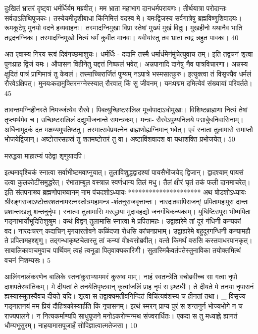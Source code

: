   दुःखितं भ्रातरं दृष्ट्वा धर्मर्धिर्यम मब्रवीत्।
 मम भ्राता महाभाग दानधर्मपरायणः।
 तीर्थयात्रा परोदान्तः सर्वदाऽतिथिपूजकः।
 तस्येयमीदृशीबाधा किंनिमित्तं वदस्व मे।
 यमःद्विजस्य सर्वगात्रेषु ब्रह्मविष्णुशिवादयः।
 रूमकूटेषु मुनयो वदने हव्यवाहनः।
 तस्मादग्निमुखा विप्रा स्तेषां मुख्यं मुखं विदुः।
 मुखहीनो यथानैव भाति तद्वदनग्निकः।
 तस्मादग्निमुखो नित्यं धर्मं कुर्वीत मानवः।
 यवीयांस्तु तव भ्राता त्वद्व न्नहुत पावकः।
 40

  अत एवास्य निरय स्त्वं दिवंगच्छमाशुचः।
 धर्मर्धिः -
ददामि तस्मै धर्मार्धमेनंमुंचेत्युवाच तम्।
 इति तद्वचनं शृत्वा पुनःप्राह द्विजं यमः।
 औपासन विहीनेतु यद्दत्तं निष्फलं भवेत्।
 अन्नपानादि दानेषु नैव पात्रविचारणा।
 अन्नस्य क्षुदितं पात्रं प्राणिमात्रं तु केवलं।
 तस्माच्चिरार्जितं पुण्यम् नऽपात्रे भस्मसात्कुरु।
 इत्युक्त्वा तं विसृज्यैव धर्मलं रौरवेऽक्षिपत्।
 मुनयःकदामुक्तिरनग्नेस्स्यात् रौरवात् किं सु जीवनम्।
 यमःपद्मम दमित्येवं संख्यायां परिवर्तते।
 45

  तावन्तमग्निहीनस्ते निमज्जंत्येव रौरवे।
 पिबत्युच्छिष्टसलिल मूर्ध्वपादाऽधोमुखाः।
 विशिष्टब्राह्मणा नित्यं तेषां तृप्त्यर्थमेव च।
 उच्छिष्टसलिलं दद्युभॊजनान्ते समन्त्रकम्।
 मन्त्रः- रौरवेऽपुण्यनिलये पद्मार्बुधनिवासिनाम्।
 अर्धिनामुदकं दत मक्षय्यमुपतिष्ठतु।
 तस्मात्सर्वप्रयत्नेन ब्राह्मणोह्यग्निमान् भवेत्।
 एवं स्नाता तुलामासे समाप्तौ भोजयेद्विजान्।
 अष्टोत्तरसहस्रं तु शतमष्टोत्तरं तु वा।
 अष्टाविंशवादश वा यथाशक्ति प्रभोजयेत्।
 50

  मरुद्धया माहात्म्यं पठेद्वा शृणुयादपि।
 
इत्थमावृश्चिकं स्नात्वा सर्वाभीष्टमवाप्नुयात्।
 तुलाविशुद्धद्वादश्यां पायसैभॊजयेद् द्विजान्।
 द्वादश्याम् पायसं दत्वा कुलकोटींसमुद्धरेत्।
 रंभाताम्बूल वस्त्रान्न स्वर्णधान्य तिलं मधु।
 तैलं क्षीरं घृतं तकं फली दानमाचरेत्।
 इति संतपनाख्य ब्रह्मणोपाख्यानम् नाम
पंचदशोऽध्यायः
*********************
अथ षोडशोऽध्यायः श्रीरङ्गराजाऽष्टोत्तरशतनामरत्नस्तोत्रमहामन्त्र
-शंतनुराजवृत्तान्तः।
 नारदःतवापिराजन्! प्रपितामहःपुरा दान्तः
प्रशान्तःखलु शन्तनुर्नृपः।
 स्नात्वा तुलामासि मरुद्धाया
मुदावहद्यो जनगंधिकन्यकाम्।
 युधिष्टिरःपुरा भीष्मपिता गङ्गाभार्योभूदितिशुश्रुम।
 कथं विद्वन् तुलामासि स्नात्वा मे प्रपितामहः।
 उद्वाह्यरेमे तां दूरं गंधिनी कन्यकां वद।
 नारदःचरन् कदाचिन् मृगयारतोवने
कळिंदजा रोधसि कांचनप्रभाम्।
 उद्वाह्यरेमे बहुदूरगन्धिनी
कन्यामहौ ते प्रपितामहश्शृणु।
 तद्गन्धाकृष्टचेतास्तु तां कन्यां वीक्ष्यसोब्रवीत्।
 वत्से किमर्थं वससि कस्तवाधरपानकृत्।
 साबालिकावाचमुवाच पार्थिवम्
त्वहं त्वनूडा पितृवाक्यकारिणी।
 सुतास्मिकैवर्तपतेस्तुनाविका
तयोक्तमित्थं वचनं निशम्यसः।
5

 आलिंगनालंकरणेन बालिके
स्तनांकुराभ्याममरं कुरुष्व माम्।
 नाहं स्वतन्त्रेति वचोब्रवीच्च सा
गत्वा नृपो दाशपतेरथांतिकम्।
 मे दीयतां ते तनयेतिपृष्टवान्
कृत्वांजलिं प्राह नृपं स हृष्टधीः।
 ते दीयते मे तनया नृपासनं
ह्यस्यास्सुतस्यैवच दीयते यदि।
 शृत्वा स तद्वाक्यमतीवनिन्दितं
विचिंत्यवंशस्य च हीनतां तथा।
 _ विसृज्य गङ्गातनयं मम प्रियं
दौहित्रकोस्यार्हति किं नृपासनम्।
 इत्थं स्मरन् प्राप्य पुरं स शन्तनुर्न
भोज्यभोगे न च राज्यपालने।
 न नित्यकर्माण्यपि साधुपूजने मनोऽकरोन्मन्मथ संज्वरार्धितः।
 एकदा स तु मध्याह्ने ह्यागतं धौम्यभूसुरम्।
 नाहयामासपूजाहँ सोपिज्ञात्वात्मतेजसा।
 10

